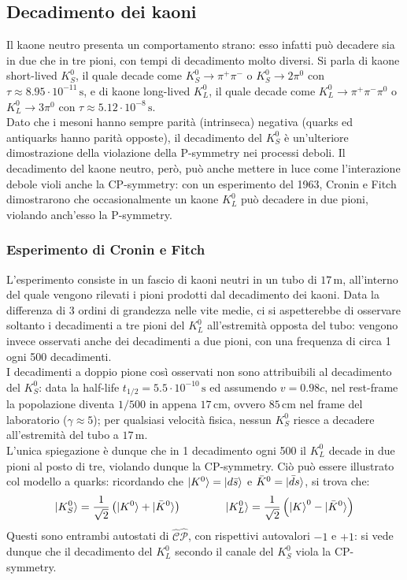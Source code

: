 \subsection{Decadimento dei kaoni}

Il kaone neutro presenta un comportamento strano: esso infatti può decadere sia in due che in tre pioni, con tempi di decadimento molto diversi. Si parla di kaone short-lived $ K^0_S $, il quale decade come $ K^0_S \rightarrow \pi^+ \pi^- $ o $ K^0_S \rightarrow 2\pi^0 $ con $ \tau \approx 8.95\cdot10^{-11}\,\text{s} $, e di kaone long-lived $ K^0_L $, il quale decade come $ K^0_L \rightarrow \pi^+ \pi^- \pi^0 $ o $ K^0_L \rightarrow 3\pi^0 $ con $ \tau \approx 5.12\cdot10^{-8}\,\text{s} $.\\
Dato che i mesoni hanno sempre parità (intrinseca) negativa (quarks ed antiquarks hanno parità opposte), il decadimento del $ K^0_S $ è un'ulteriore dimostrazione della violazione della P-symmetry nei processi deboli.
Il decadimento del kaone neutro, però, può anche mettere in luce come l'interazione debole violi anche la CP-symmetry: con un esperimento del 1963, Cronin e Fitch dimostrarono che occasionalmente un kaone $ K^0_L $ può decadere in due pioni, violando anch'esso la P-symmetry.

\subsubsection{Esperimento di Cronin e Fitch}

L'esperimento consiste in un fascio di kaoni neutri in un tubo di $ 17\,\text{m} $, all'interno del quale vengono rilevati i pioni prodotti dal decadimento dei kaoni. Data la differenza di 3 ordini di grandezza nelle vite medie, ci si aspetterebbe di osservare soltanto i decadimenti a tre pioni del $ K^0_L $ all'estremità opposta del tubo: vengono invece osservati anche dei decadimenti a due pioni, con una frequenza di circa 1 ogni 500 decadimenti.\\
I decadimenti a doppio pione così osservati non sono attribuibili al decadimento del $ K^0_S $: data la half-life $ t_{1/2} = 5.5\cdot10^{-10}\,\text{s} $ ed assumendo $ v = 0.98c $, nel rest-frame la popolazione diventa $ 1/500 $ in appena $ 17\,\text{cm} $, ovvero $ 85\,\text{cm} $ nel frame del laboratorio ($ \gamma \approx 5 $); per qualsiasi velocità fisica, nessun $ K^0_S $ riesce a decadere all'estremità del tubo a $ 17\,\text{m} $.\\
L'unica spiegazione è dunque che in 1 decadimento ogni 500 il $ K^0_L $ decade in due pioni al posto di tre, violando dunque la CP-symmetry. Ciò può essere illustrato col modello a quarks: ricordando che $ \ket{K^0} = \ket{d\bar{s}} $ e $ \bar{K}^0 = \ket{\bar{d}s} $, si trova che:
\begin{equation*}
	\ket{K^0_S} = \frac{1}{\sqrt{2}} \left( \ket{K^0} + \ket{\bar{K}^0} \right)
	\qquad \qquad
	\ket{K^0_L} = \frac{1}{\sqrt{2}} \left( \ket{K}^0 - \ket{\bar{K}^0} \right)
\end{equation*}
Questi sono entrambi autostati di $ \hat{\mathcal{C}}\hat{\mathcal{P}} $, con rispettivi autovalori $ -1 $ e $ +1 $: si vede dunque che il decadimento del $ K^0_L $ secondo il canale del $ K^0_S $ viola la CP-symmetry.

